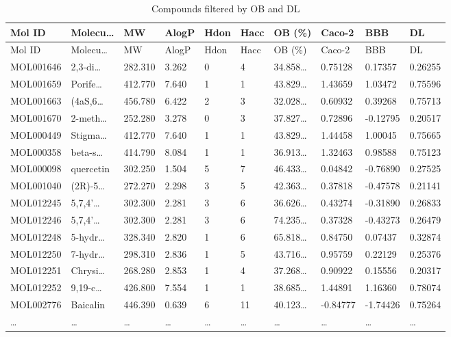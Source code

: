 \documentclass[
]{article}
\begin{document}
\begin{longtable}[]{@{}llllllllll@{}}
\caption{\label{tab:Compounds-filtered-by-OB-and-DL}Compounds filtered by OB and DL}\tabularnewline
\toprule
Mol ID & Molecu\ldots{} & MW & AlogP & Hdon & Hacc & OB (\%) & Caco-2 & BBB & DL\tabularnewline
\midrule
\endfirsthead
\toprule
Mol ID & Molecu\ldots{} & MW & AlogP & Hdon & Hacc & OB (\%) & Caco-2 & BBB & DL\tabularnewline
\midrule
\endhead
MOL001646 & 2,3-di\ldots{} & 282.310 & 3.262 & 0 & 4 & 34.858\ldots{} & 0.75128 & 0.17357 & 0.26255\tabularnewline
MOL001659 & Porife\ldots{} & 412.770 & 7.640 & 1 & 1 & 43.829\ldots{} & 1.43659 & 1.03472 & 0.75596\tabularnewline
MOL001663 & (4aS,6\ldots{} & 456.780 & 6.422 & 2 & 3 & 32.028\ldots{} & 0.60932 & 0.39268 & 0.75713\tabularnewline
MOL001670 & 2-meth\ldots{} & 252.280 & 3.278 & 0 & 3 & 37.827\ldots{} & 0.72896 & -0.12795 & 0.20517\tabularnewline
MOL000449 & Stigma\ldots{} & 412.770 & 7.640 & 1 & 1 & 43.829\ldots{} & 1.44458 & 1.00045 & 0.75665\tabularnewline
MOL000358 & beta-s\ldots{} & 414.790 & 8.084 & 1 & 1 & 36.913\ldots{} & 1.32463 & 0.98588 & 0.75123\tabularnewline
MOL000098 & quercetin & 302.250 & 1.504 & 5 & 7 & 46.433\ldots{} & 0.04842 & -0.76890 & 0.27525\tabularnewline
MOL001040 & (2R)-5\ldots{} & 272.270 & 2.298 & 3 & 5 & 42.363\ldots{} & 0.37818 & -0.47578 & 0.21141\tabularnewline
MOL012245 & 5,7,4'\ldots{} & 302.300 & 2.281 & 3 & 6 & 36.626\ldots{} & 0.43274 & -0.31890 & 0.26833\tabularnewline
MOL012246 & 5,7,4'\ldots{} & 302.300 & 2.281 & 3 & 6 & 74.235\ldots{} & 0.37328 & -0.43273 & 0.26479\tabularnewline
MOL012248 & 5-hydr\ldots{} & 328.340 & 2.820 & 1 & 6 & 65.818\ldots{} & 0.84750 & 0.07437 & 0.32874\tabularnewline
MOL012250 & 7-hydr\ldots{} & 298.310 & 2.836 & 1 & 5 & 43.716\ldots{} & 0.95759 & 0.22129 & 0.25376\tabularnewline
MOL012251 & Chrysi\ldots{} & 268.280 & 2.853 & 1 & 4 & 37.268\ldots{} & 0.90922 & 0.15556 & 0.20317\tabularnewline
MOL012252 & 9,19-c\ldots{} & 426.800 & 7.554 & 1 & 1 & 38.685\ldots{} & 1.44891 & 1.16360 & 0.78074\tabularnewline
MOL002776 & Baicalin & 446.390 & 0.639 & 6 & 11 & 40.123\ldots{} & -0.84777 & -1.74426 & 0.75264\tabularnewline
\ldots{} & \ldots{} & \ldots{} & \ldots{} & \ldots{} & \ldots{} & \ldots{} & \ldots{} & \ldots{} & \ldots{}\tabularnewline
\bottomrule
\end{longtable}

\begin{center}\vspace{1.5cm}\end{center}
\end{document}
